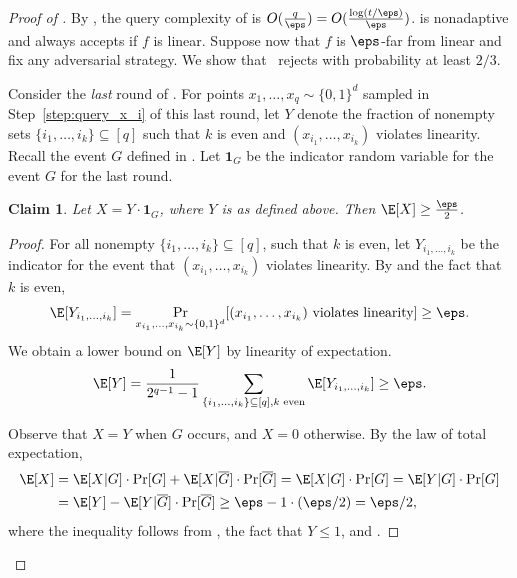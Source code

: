 \documentclass[11pt]{article}
\numberwithin{equation}{section}
\newtheorem{claim}[theorem]{Claim}
\theoremstyle{definition}
\theoremstyle{plain}
\begin{document}
\begin{proof}[Proof of ]
By , the query complexity of  is $O(\frac q \eps)=O(\frac{\log (t/\eps)}\eps)$.  is nonadaptive and always accepts if $f$ is linear. Suppose now that $f$ is $\eps$-far from linear and fix any adversarial strategy. We show that~ rejects with probability at least $2/3$. 

 Consider the \emph{last} round of . For points $x_1, \dots, x_q \sim \{0,1\}^d$ sampled in Step~\ref{step:query_x_i} of this last round, let $Y$ denote the fraction of nonempty sets $\{i_1, \dots, i_{k}\} \subseteq [q]$ such that $k$ is even and $(x_{i_1}, \dots, x_{i_{k}})$ violates linearity. Recall the event $G$ defined in . Let  $\mathbf{1}_{G}$ be the indicator random variable for the event $G$ for the last round. 
 

\begin{claim}\label{clm:x}
Let $X = Y \cdot \mathbf{1}_{G}$, where $Y$ is as defined above. Then $\E[X] \geq \frac{\eps}{2}$. 
\end{claim}
\begin{proof}
For all nonempty $\{i_1, \dots, i_k \} \subseteq [q]$, such that $k$ is even, let $Y_{i_1,\dots, i_{k}}$ be the indicator
for the event that $(x_{i_1}, \dots, x_{i_{k}})$ violates linearity. By  and the fact that $k$ is even, 
\[\E[Y_{i_1,\dots, i_{k}}] = \Pr_{x_{i_1},\dots,  x_{i_{k}} \sim \{0,1\}^d}[ (x_{i_1}, \dots, x_{i_{k}})\textnormal{ violates linearity}] \geq \eps.\] 
We obtain a lower bound on $\E[Y]$ by linearity of expectation.
\begin{equation}\label{eq:y}
    \E[Y]= \frac{1}{2^{q-1} - 1}\sum_{\{i_1, \dots, i_k\} \subseteq [q],k \textnormal{ even}} \E[Y_{i_1,\dots, i_{k}}] \geq \eps.
\end{equation}
%

Observe that $X=Y$ when $G$ occurs, and $X=0$ otherwise. By the law of total expectation,
\begin{align*}
 \E[X] &=\E[X|G]\cdot\Pr[G]+ \E[X|\overline{G}]\cdot\Pr[\overline{G}] 
 = \E[X|G]\cdot\Pr[G]=\E[Y|G]\cdot\Pr[G] \\
&=\E[Y]- \E[Y|\overline{G}]\cdot\Pr[\overline{G}]\geq \eps - 1\cdot (\eps/2) = \eps/2,
\end{align*}
where the inequality follows from  , the fact that $Y\leq 1$, and . 
\end{proof}



\end{proof}
\end{document}
